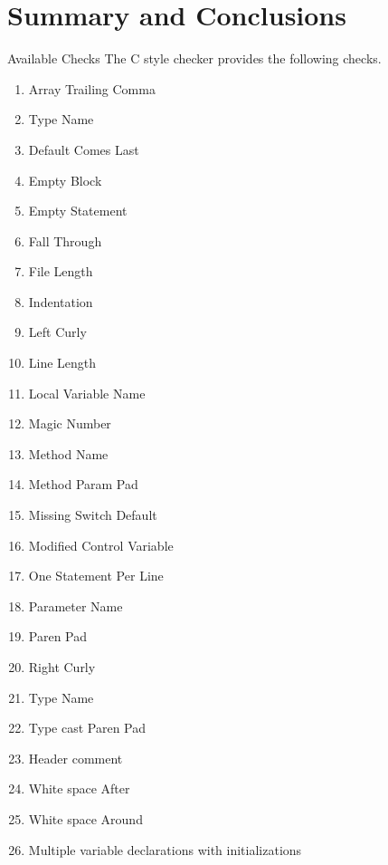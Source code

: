 \documentclass[compress]{beamer}
\begin{document}
\section{Summary and Conclusions}
\begin{frame}{Available Checks}
    The C style checker provides the following checks.
    \begin{multicols}{2}
    \scriptsize{\begin{enumerate}
        \item Array Trailing Comma
        \item Type Name
        \item Default Comes Last
        \item Empty Block
        \item Empty Statement 
        \item Fall Through
        \item File Length
        \item Indentation
        \item Left Curly
        \item Line Length
        \item Local Variable Name
        \item Magic Number
        \item Method Name
        \item Method Param Pad 
        \item Missing Switch Default
        \item Modified Control Variable
        \item One Statement Per Line
        \item Parameter Name
        \item Paren Pad
        \item Right Curly
        \item Type Name
        \item Type cast Paren Pad
        \item Header comment
        \item White space After
        \item White space Around
        \item Multiple variable declarations with initializations
        
    \note{
    
}
\end{enumerate}}
\end{multicols}
\end{frame}
\end{document}
